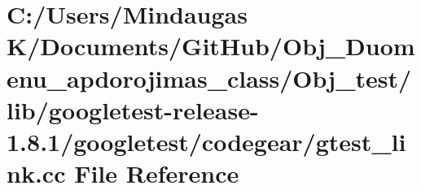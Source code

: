 \hypertarget{_obj__test_2lib_2googletest-release-1_88_81_2googletest_2codegear_2gtest__link_8cc}{}\section{C\+:/\+Users/\+Mindaugas K/\+Documents/\+Git\+Hub/\+Obj\+\_\+\+Duomenu\+\_\+apdorojimas\+\_\+class/\+Obj\+\_\+test/lib/googletest-\/release-\/1.8.1/googletest/codegear/gtest\+\_\+link.cc File Reference}
\label{_obj__test_2lib_2googletest-release-1_88_81_2googletest_2codegear_2gtest__link_8cc}
